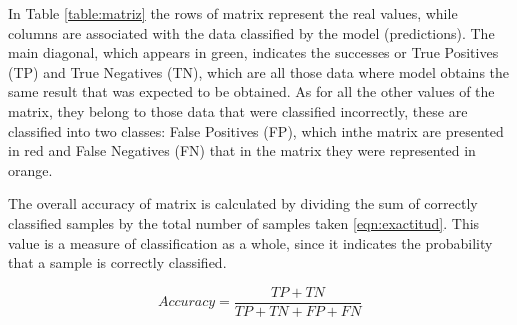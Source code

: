 In Table \ref{table:matriz} the rows of matrix represent the real values, while columns are associated with the data classified by the model (predictions). The main diagonal, which appears in green, indicates the successes or True Positives (TP) and True Negatives (TN), which are all those data where model obtains the same result that was expected to be obtained. As for all the other values of the matrix, they belong to those data that were classified incorrectly, these are classified into two classes: False Positives (FP), which inthe  matrix are presented in red and False Negatives (FN) that in the matrix they were represented in orange.

\vspace{5mm} %

The overall accuracy of matrix is calculated by dividing the sum of  correctly classified samples by the total number of samples taken \ref{eqn:exactitud}. This value is a measure of classification as a whole, since it indicates the probability that a sample is correctly classified.

\begin{equation}
Accuracy=\frac{TP+TN}{TP+TN+FP+FN}
\label{eqn:exactitud}
\end{equation}

